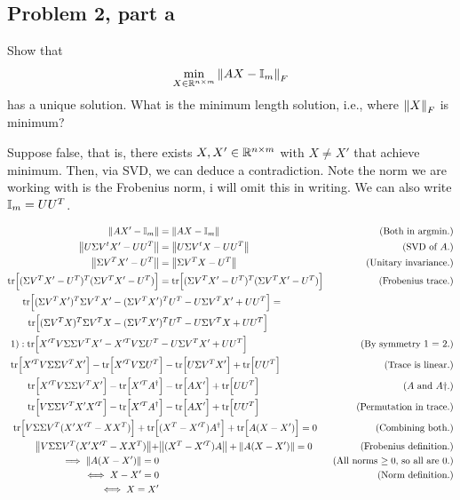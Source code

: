 \subsection{Problem 2, part a}
Show that 
\[
\min_{X \in \mathbb{R}^{n\times m}} \norm{AX - \mathbb{I}_m}_F
\]
has a unique solution. What is the minimum length solution, i.e., where $\norm{X}_F$ is minimum?
\partbreak
\begin{solution}

    Suppose false, that is, there exists $X, X' \in \mathbb{R}^{n \times m}$ with $X \neq X'$ that achieve minimum. Then, via SVD, we can deduce a contradiction. Note the norm we are working with is the Frobenius norm, i will omit this in writing. We can also write $\mathbb{I}_m = UU^T$.
\newpage
{\small
    \alignbreak
    \begin{align}
        \norm{AX' - \mathbb{I}_m} &= \norm{AX - \mathbb{I}_m} &\text{(Both in argmin.)}\nonumber\\
        \norm{U\Sigma V^t X' - UU^T} &= \norm{U\Sigma V^t X - UU^T} &\text{(SVD of $A$.)}\nonumber\\
        \norm{\Sigma V^TX' - U^T} &= \norm{\Sigma V^TX - U^T} &\text{(Unitary invariance.)}\nonumber\\
        \text{tr} \Big[ (\Sigma V^TX' - U^T)^T(\Sigma V^TX' - U^T)\Big] &= \text{tr} \Big[ (\Sigma V^TX' - U^T)^T(\Sigma V^TX' - U^T)\Big] &\text{(Frobenius trace.)}\nonumber\\
        \text{tr} \Big[ (\Sigma V^TX')^T\Sigma V^TX' - (\Sigma V^TX'&)^TU^T - U\Sigma V^TX' + UU^T\Big] =\\
        \text{tr} \Big[ (\Sigma V^TX)^T\Sigma V^TX - (\Sigma V^TX'&)^TU^T - U\Sigma V^TX + UU^T\Big]\\
        1): \text{tr} \Big[ X'^TV\Sigma \Sigma V^TX' - X'^TV\Sigma U^T& - U\Sigma V^TX' + UU^T\Big] &\text{(By symmetry 1 = 2.)}\nonumber\\
        \text{tr} \Big[ X'^TV\Sigma \Sigma V^TX'\Big] - \text{tr} \Big[ X'^TV\Sigma U^T& \Big]- \text{tr} \Big[ U\Sigma V^TX'\Big] + \text{tr} \Big[UU^T\Big] &\text{(Trace is linear.)}\nonumber\\
        \text{tr} \Big[ X'^TV\Sigma \Sigma V^TX'\Big] - \text{tr} \Big[ X'^TA^\dag& \Big]- \text{tr} \Big[ AX'\Big] + \text{tr} \Big[UU^T\Big] &\text{($A$ and $A\dag$.)}\nonumber\\
        \text{tr} \Big[ V\Sigma \Sigma V^TX'X'^T\Big] - \text{tr} \Big[ X'^TA^\dag& \Big]- \text{tr} \Big[ AX'\Big] + \text{tr} \Big[UU^T\Big] &\text{(Permutation in trace.)}\nonumber\\
        \text{tr} \Big[ V\Sigma \Sigma V^T(X'X'^T - XX^T)\Big] + \text{tr} \Big[& (X^T - X'^T)A^\dag \Big] + \text{tr} \Big[ A(X - X')\Big] = 0 &\text{(Combining both.)}\nonumber\\
        \norm{V\Sigma \Sigma V^T(X'X'^T - XX^T)} + &\norm{(X^T - X'^T)A} + \norm{A(X - X')} = 0 &\text{(Frobenius definition.)}\nonumber\\
        \implies \norm{A(X - X')} = 0 &&\text{(All norms $\geq 0$, so all are 0.)}\nonumber\\
        \iff X - X' = 0 &&\text{(Norm definition.)}\nonumber\\
        \iff X = X'\nonumber
    \end{align}
    \alignbreak

}
\end{solution}
